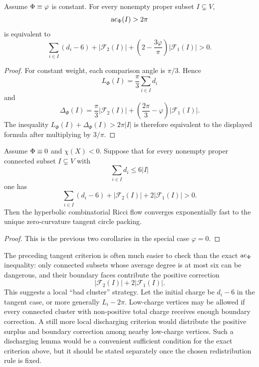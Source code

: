 \begin{corollary}\label{cor:constant-weight-formula}
\leanok
Assume $\Phi\equiv\varphi$ is constant.  For every nonempty proper
subset $I\subsetneq V$,
\[
  \operatorname{ac}_\Phi(I)>2\pi
\]
is equivalent to
\[
  \sum_{i\in I}(d_i-6)+|\mathcal F_2(I)|
  +\left(2-\frac{3\varphi}{\pi}\right)|\mathcal F_1(I)|>0.
\]
\end{corollary}

\begin{proof}
For constant weight, each comparison angle is $\pi/3$.  Hence
\[
  L_\Phi(I)=\frac{\pi}{3}\sum_{i\in I}d_i
\]
and
\[
  \Delta_\Phi(I)
  =
  \frac{\pi}{3}|\mathcal F_2(I)|
  +\left(\frac{2\pi}{3}-\varphi\right)|\mathcal F_1(I)|.
\]
The inequality $L_\Phi(I)+\Delta_\Phi(I)>2\pi |I|$ is therefore equivalent
to the displayed formula after multiplying by $3/\pi$.
\end{proof}

\begin{corollary}\label{cor:tangent-circle-packings}
\leanok
Assume $\Phi\equiv0$ and $\chi(X)<0$.  Suppose that for every nonempty
proper connected subset $I\subsetneq V$ with
\[
  \sum_{i\in I}d_i\le 6|I|
\]
one has
\[
  \sum_{i\in I}(d_i-6)+|\mathcal F_2(I)|+2|\mathcal F_1(I)|>0.
\]
Then the hyperbolic combinatorial Ricci flow converges exponentially fast
to the unique zero-curvature tangent circle packing.
\end{corollary}

\begin{proof}
This is the previous two corollaries in the special case $\varphi=0$.
\end{proof}

\begin{remark}
The preceding tangent criterion is often much easier to check than the
exact $\operatorname{ac}_\Phi$ inequality: only connected subsets whose average degree is
at most six can be dangerous, and their boundary faces contribute the
positive correction
\[
  |\mathcal F_2(I)|+2|\mathcal F_1(I)|.
\]
This suggests a local ``bad cluster'' strategy.  Let the initial charge be
$d_i-6$ in the tangent case, or more generally $L_i-2\pi$.  Low-charge
vertices may be allowed if every connected cluster with non-positive total
charge receives enough boundary correction.  A still more local
discharging criterion would distribute the positive surplus and boundary
correction among nearby low-charge vertices.  Such a discharging lemma
would be a convenient sufficient condition for the exact criterion above,
but it should be stated separately once the chosen redistribution rule is
fixed.
\end{remark}


